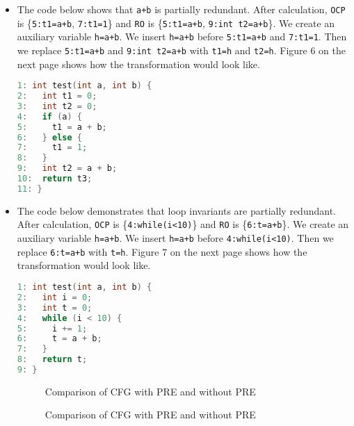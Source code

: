 \documentclass[onecolumn,10pt]{journal}
\begin{document}
\begin{itemize}
\item  The code below shows that \texttt{a+b} is partially redundant. After calculation, \texttt{OCP} is \{\texttt{5:t1=a+b}, \texttt{7:t1=1}\} and \texttt{RO} is \{\texttt{5:t1=a+b}, \texttt{9:int t2=a+b}\}. We create an auxiliary variable \texttt{h=a+b}. We insert \texttt{h=a+b} before \texttt{5:t1=a+b} and \texttt{7:t1=1}. Then we replace \texttt{5:t1=a+b} and \texttt{9:int t2=a+b} with \texttt{t1=h} and \texttt{t2=h}. Figure 6 on the next page shows how the transformation would look like.   
\begin{lstlisting}[language=c]
1: int test(int a, int b) {
2:   int t1 = 0;
3:   int t2 = 0;
4:   if (a) {
5:     t1 = a + b;
6:   } else {
7:     t1 = 1;
8:   }
9:   int t2 = a + b;
10:  return t3;
11: }
\end{lstlisting}

\item The code below demonstrates that loop invariants are partially redundant. After calculation, \texttt{OCP} is \{\texttt{4:while(i<10)}\} and \texttt{RO} is \{\texttt{6:t=a+b}\}. We create an auxiliary variable \texttt{h=a+b}. We insert \texttt{h=a+b} before \texttt{4:while(i<10)}. Then we replace \texttt{6:t=a+b} with \texttt{t=h}. Figure 7 on the next page shows how the transformation would look like.     
\begin{lstlisting}[language=c]
1: int test(int a, int b) {
2:   int i = 0;
3:   int t = 0;
4:   while (i < 10) {
5:     i += 1;
6:     t = a + b;
7:   }
8:   return t;
9: }
\end{lstlisting}
\pagebreak
\begin{figure}[bp!]
     \centering
     \caption{Comparison of CFG with PRE and without PRE}
     \label{if}
\end{figure}

\begin{figure}[bp!]
     \centering
     \caption{Comparison of CFG with PRE and without PRE}
     \label{while}
\end{figure}
 
\end{itemize}
\end{document}
